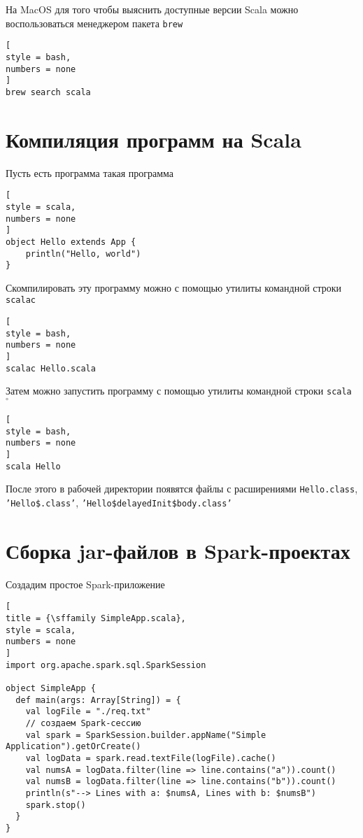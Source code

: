 \documentclass[%
	11pt,
	a4paper,
	utf8,
		]{article}
\begin{document}
На MacOS для того чтобы выяснить доступные версии Scala можно воспользоваться менеджером пакета \texttt{brew}
\begin{lstlisting}[
style = bash,
numbers = none	
]
brew search scala
\end{lstlisting}


\section{Компиляция программ на Scala}

Пусть есть программа такая программа
\begin{lstlisting}[
style = scala,
numbers = none	
]
object Hello extends App {
	println("Hello, world")
}
\end{lstlisting}

Скомпилировать эту программу можно с помощью утилиты командной строки \texttt{scalac}
\begin{lstlisting}[
style = bash,
numbers = none	
]
scalac Hello.scala
\end{lstlisting}

Затем можно запустить программу с помощью утилиты командной строки \texttt{scala} $ {}^{\circ} $
\begin{lstlisting}[
style = bash,
numbers = none	
]
scala Hello
\end{lstlisting}

После этого в рабочей директории появятся файлы с расширениями \texttt{Hello.class}, \texttt{'Hello\$.class'}, \texttt{'Hello\$delayedInit\$body.class'}

\section{Сборка jar-файлов в Spark-проектах}

Создадим простое Spark-приложение 
\begin{lstlisting}[
title = {\sffamily SimpleApp.scala},
style = scala,
numbers = none	
]
import org.apache.spark.sql.SparkSession

object SimpleApp {
  def main(args: Array[String]) = {
    val logFile = "./req.txt"
    // создаем Spark-сессию
    val spark = SparkSession.builder.appName("Simple Application").getOrCreate()
    val logData = spark.read.textFile(logFile).cache()
    val numsA = logData.filter(line => line.contains("a")).count()
    val numsB = logData.filter(line => line.contains("b")).count()
    println(s"--> Lines with a: $numsA, Lines with b: $numsB")
    spark.stop()
  }
}
\end{lstlisting}
\end{document}
